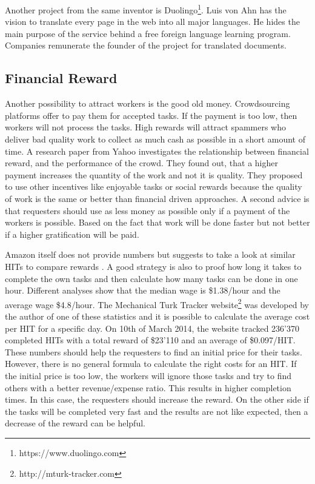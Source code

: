 Another project from the same inventor is Duolingo\footnote{https://www.duolingo.com}. Luis von Ahn has the vision to translate every page in the web into all major languages. He hides the main purpose of the service behind a free foreign language learning program. Companies remunerate the founder of the project for translated documents.

\subsection{Financial Reward}
Another possibility to attract workers is the good old money. Crowdsourcing platforms offer to pay them for accepted tasks. If the payment is too low, then workers will not process the tasks. High rewards will attract spammers who deliver bad quality work to collect as much cash as possible in a short amount of time. A research paper from Yahoo \cite{mason} investigates the relationship between financial reward, and the performance of the crowd. They found out, that a higher payment increases the quantity of the work and not it is quality. They proposed to use other incentives like enjoyable tasks or social rewards because the quality of work is the same or better than financial driven approaches. A second advice is that requesters should use as less money as possible only if a payment of the workers is possible. Based on the fact that work will be done faster but not better if a higher gratification will be paid.

Amazon itself does not provide numbers but suggests to take a look at similar HITs to compare rewards \cite{mturk_bestpractices}. A good strategy is also to proof how long it takes to complete the own tasks and then calculate how many tasks can be done in one hour. Different analyses \cite{chilton,ipeirotis} show that the median wage is \$1.38/hour and the average wage \$4.8/hour. The Mechanical Turk Tracker website\footnote{http://mturk-tracker.com} was developed by the author of one of these statistics \cite{ipeirotis} and it is possible to calculate the average cost per HIT for a specific day. On 10th of March 2014, the website tracked 236'370 completed HITs with a total reward of \$23'110 and an average of \$0.097/HIT. These numbers should help the requesters to find an initial price for their tasks. However, there is no general formula to calculate the right costs for an HIT. If the initial price is too low, the workers will ignore those tasks and try to find others with a better revenue/expense ratio. This results in higher completion times. In this case, the requesters should increase the reward. On the other side if the tasks will be completed very fast and the results are not like expected, then a decrease of the reward can be helpful.

